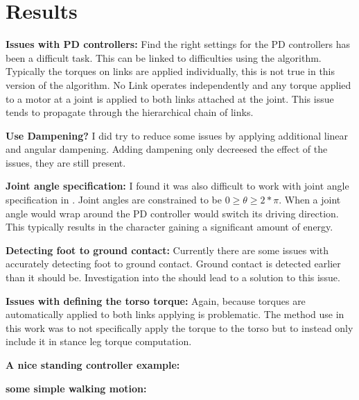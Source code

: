 

\section{Results}
\label{sec:results}


	\noindent \textbf{Issues with PD controllers:}
	Find the right settings for the PD controllers has been a difficult task. This can be linked to difficulties using the \Featherstone algorithm. Typically the torques on links are applied individually, this is not true in this version of the \Featherstone algorithm. No Link operates independently and any torque applied to a motor at a joint is applied to both links attached at the joint. This issue tends to propagate through the hierarchical chain of links. 
	
	\noindent \textbf{Use Dampening?}
	I did try to reduce some issues by applying additional linear and angular dampening. Adding dampening only decreesed the effect of the issues, they are still present.
	
	\noindent \textbf{Joint angle specification:}
	I found it was also difficult to work with joint angle specification in \bulletPhysics. Joint angles are constrained to be $0 \geq \theta \geq 2*\pi $. When a joint angle would wrap around the PD controller would switch its driving direction. This typically results in the character gaining a significant amount of energy.
	
	\noindent \textbf{Detecting foot to ground contact:}
	Currently there are some issues with accurately detecting foot to ground contact. Ground contact is detected earlier than it should be. Investigation into the \bulletPhysics should lead to a solution to this issue.
	
	\noindent \textbf{Issues with defining the torso torque:}
	Again, because torques are automatically applied to both links applying \torqueTorso is problematic. The method use in this work was to not specifically apply the torque to the torso but to instead only include it in stance leg torque computation.
	
	\noindent \textbf{A nice standing controller example:}
	
	
	
	\noindent \textbf{some simple walking motion:}
